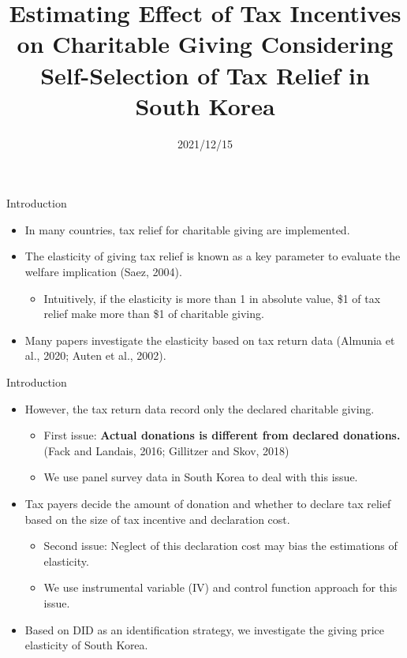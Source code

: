 \documentclass[
  ignorenonframetext,
  aspectratio=169,
]{beamer}
\title{Estimating Effect of Tax Incentives on Charitable Giving Considering Self-Selection of Tax Relief in South Korea  }
\author[shortname]{ Hiroki Kato \inst{1} \and  Tsuyoshi Goto \inst{2} \and  Yong-Rok Kim \inst{3} \and }
\institute[shortinst]{ \inst{1} Osaka University \and  \inst{2} Chiba University \and  \inst{3} Kansai University \and }
\date{2021/12/15}
\providecommand{\tightlist}{%
  \setlength{\itemsep}{0pt}\setlength{\parskip}{0pt}}
\begin{document}
\frame{\titlepage}

\begin{frame}{Introduction}
\protect\hypertarget{introduction}{}
\begin{itemize}
\tightlist
\item
  In many countries, tax relief for charitable giving are implemented.
\item
  The elasticity of giving tax relief is known as a key parameter to evaluate the welfare implication (Saez, 2004).

  \begin{itemize}
  \tightlist
  \item
    Intuitively, if the elasticity is more than 1 in absolute value, \$1 of tax relief make more than \$1 of charitable giving.
  \end{itemize}
\item
  Many papers investigate the elasticity based on tax return data (Almunia et al., 2020; Auten et al., 2002).
\end{itemize}
\end{frame}

\begin{frame}{Introduction}
\protect\hypertarget{introduction-1}{}
\begin{itemize}
\tightlist
\item
  However, the tax return data record only the declared charitable giving.

  \begin{itemize}
  \tightlist
  \item
    First issue: \textbf{Actual donations is different from declared donations.} (Fack and Landais, 2016; Gillitzer and Skov, 2018)
  \item
    We use panel survey data in South Korea to deal with this issue.
  \end{itemize}
\item
  Tax payers decide the amount of donation and whether to declare tax relief based on the size of tax incentive and declaration cost.

  \begin{itemize}
  \tightlist
  \item
    Second issue: Neglect of this declaration cost may bias the estimations of elasticity.
  \item
    We use instrumental variable (IV) and control function approach for this issue.
  \end{itemize}
\item
  Based on DID as an identification strategy, we investigate the giving price elasticity of South Korea.
\end{itemize}
\end{frame}
\end{document}
